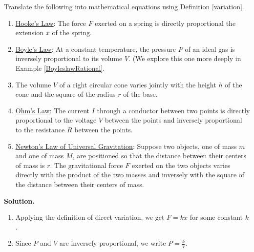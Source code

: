 \documentclass{ximera}
\begin{document}
\begin{example} \label{variationexample} Translate the following into mathematical equations using Definition \ref{variation}.

\begin{enumerate}

\item  \href{http://en.wikipedia.org/wiki/Hooke's_law}{\underline{Hooke's Law}}:   The force $F$ exerted on a spring is directly proportional the extension $x$ of the spring.

\item  \href{http://en.wikipedia.org/wiki/Boyle's_law}{\underline{Boyle's Law}}:   At a constant temperature, the pressure $P$ of an ideal gas is inversely proportional to its volume $V$.  (We explore this one more deeply in Example \ref{BoyleslawRational}.

\item  The volume $V$ of a right circular cone varies jointly with the height $h$ of the cone and the square of the radius $r$ of the base.

\item  \href{http://en.wikipedia.org/wiki/Ohm's_law}{\underline{Ohm's Law}}:   The current $I$ through a conductor between two points is directly proportional to the voltage $V$ between the points and inversely proportional to the resistance $R$ between the points.

\item \label{gravitylaw} \href{http://en.wikipedia.org/wiki/Law_of_universal_gravitation}{\underline{Newton's Law of Universal Gravitation}}:   Suppose two objects, one of mass $m$ and one of mass $M$, are positioned so that the distance between their centers of mass is $r$.  The gravitational force $F$ exerted on the two objects varies directly with the product of the two masses and inversely with the square of the distance between their centers of mass.

\end{enumerate}

{\bf Solution.}  

\begin{enumerate}

\item Applying the definition of direct variation, we get  $F = k x$ for some constant $k$.

\item Since $P$ and $V$ are inversely proportional, we write $P = \frac{k}{V}$.


\end{enumerate}
\end{example}
\end{document}
